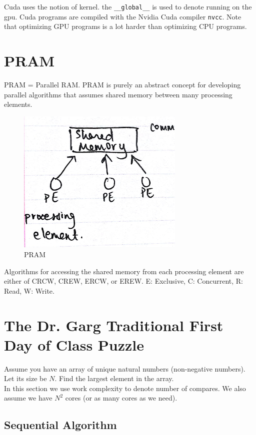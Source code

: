 \documentclass[twoside]{article}
\begin{document}
Cuda uses the notion of kernel. the {\tt \_\_global\_\_} is used to denote running on the gpu. Cuda programs are compiled with the Nvidia Cuda compiler {\tt nvcc}.
Note that optimizing GPU programs is a lot harder than optimizing CPU programs.

\section{PRAM}

PRAM = Parallel RAM. PRAM is purely an abstract concept for developing parallel algorithms that assumes shared memory between many processing elements.

\begin{figure}[h!]
\centering
\includegraphics[width=80mm]{pram}
\caption{PRAM}
\label{fig:method}
\end{figure}

Algorithms for accessing the shared memory from each processing element are either of CRCW, CREW, ERCW, or EREW. E: Exclusive, C: Concurrent, R: Read, W: Write.

\section{The Dr. Garg Traditional First Day of Class Puzzle}

Assume you have an array of unique natural numbers (non-negative numbers). Let its size be $N$. Find the largest element in the array.\\
In this section we use work complexity to denote number of compares. We also assume we have $N^2$ cores (or as many cores as we need).

\subsection{Sequential Algorithm}
\end{document}
